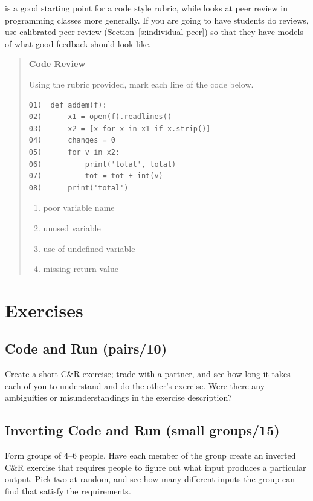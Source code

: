 \cite{Steg2016b} is a good starting point for a code style rubric,
while \cite{Luxt2009} looks at peer review in programming classes
more generally. If you are going to have students do reviews, use
calibrated peer review (Section~\ref{s:individual-peer}) so that they
have models of what good feedback should look like.

\begin{quote}\setlength{\parindent}{0pt}
\textbf{Code Review}

Using the rubric provided, mark each line of the code below.

\begin{verbatim}
01)  def addem(f):
02)      x1 = open(f).readlines()
03)      x2 = [x for x in x1 if x.strip()]
04)      changes = 0
05)      for v in x2:
06)          print('total', total)
07)          tot = tot + int(v)
08)      print('total')
\end{verbatim}

\begin{enumerate}
\tightlist
\item
  poor variable name
\item
  unused variable
\item
  use of undefined variable
\item
  missing return value
\end{enumerate}
\end{quote}

\section{Exercises}\label{s:exercises-exercises}

\subsection{Code and Run (pairs/10)}\label{code-and-run-pairs10}

Create a short C\&R exercise; trade with a partner, and see how long it
takes each of you to understand and do the other's exercise. Were there
any ambiguities or misunderstandings in the exercise description?

\subsection{Inverting Code and Run (small groups/15)}\label{inverting-code-and-run-small-groups15}

Form groups of 4--6 people. Have each member of the group create an
inverted C\&R exercise that requires people to figure out what input
produces a particular output. Pick two at random, and see how many
different inputs the group can find that satisfy the requirements.

